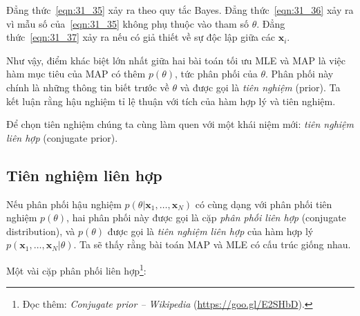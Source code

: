Đẳng thức~\eqref{eqn:31_35} xảy ra theo quy tắc Bayes. Đẳng
thức~\eqref{eqn:31_36} xảy ra vì mẫu số của~\eqref{eqn:31_35} không phụ thuộc vào
tham số $\theta$. Đẳng thức~\eqref{eqn:31_37} xảy ra nếu có giả thiết về
sự độc lập giữa các $\mathbf{x}_i$.


Như vậy, điểm khác biệt lớn nhất giữa hai bài toán tối ưu MLE và MAP là việc hàm
mục tiêu của MAP có thêm $p(\theta)$, tức phân phối của $\theta$. Phân phối này
chính là những thông tin biết trước về $\theta$ và được gọi là
\textit{tiên nghiệm} (prior). Ta kết luận rằng hậu nghiệm tỉ lệ thuận với
tích của hàm hợp lý và tiên nghiệm.


Để chọn tiên nghiệm chúng ta cùng làm quen với một khái
niệm mới: \textit{tiên nghiệm liên hợp} (conjugate prior).


\subsection{Tiên nghiệm liên hợp}
Nếu phân phối hậu nghiệm $p(\theta | \mathbf{x}_1, \dots,
\mathbf{x}_N)$ có cùng dạng với phân phối tiên nghiệm $p(\theta)$, hai phân phối này được gọi là cặp \textit{phân phối liên hợp} (conjugate distribution), và $p(\theta)$ được
gọi là \textit{tiên nghiệm liên hợp} của hàm hợp lý $p(\mathbf{x}_1, \dots,
\mathbf{x}_N | \theta)$. Ta sẽ thấy rằng bài toán MAP và MLE có cấu trúc giống nhau.


Một vài cặp phân phối liên hợp\footnote{Đọc thêm:
\textit{Conjugate prior -- Wikipedia} (\url{https://goo.gl/E2SHbD}).}:

